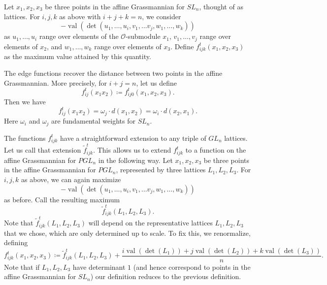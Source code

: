 \documentclass[ALCO,ThmDefs,Unicode,epreuves]{cedram}
\newcommand{\cO}{\mathcal{O}}
\newcommand{\val}{\operatorname{val}}
\begin{document}
Let $x_1, x_2, x_3$ be three points in the affine Grassmannian for $SL_n$, thought of as lattices. For $i, j, k$ as above with $i+j+k=n$, we consider
\[
-\val(\det(u_1, \dots, u_i, v_1, \dots v_j, w_1, \dots, w_k))
\]
as $u_1, \dots, u_i$ range over elements of the $\cO$-submodule $x_1$, $v_1, \dots, v_j$ range over elements of $x_2$, and $w_1, \dots, w_k$ range over elements of $x_3$. Define $f_{ijk}^t (x_1,x_2,x_3)$ as the maximum value attained by this quantity.

\begin{rema} The edge functions recover the distance between two points in the affine Grassmannian. More precisely, for $i+j=n$, let us define
\[
f^t_{ij}(x_1x_2) \coloneqq  f_{ij0}^t (x_1,x_2,x_3).
\]
Then we have
\[
f^t_{ij}(x_1x_2) = \omega_j \cdot d(x_1,x_2) = \omega_i \cdot d(x_2,x_1).
\]
 Here $\omega_i$ and $\omega_j$ are fundamental weights for $SL_n$.
\end{rema}


The functions $f_{ijk}^t$ have a straightforward extension to any triple of $GL_n$ lattices. Let us call that extension $\tilde{f}_{ijk}^t.$ This allows us to extend $f_{ijk}^t$ to a function on the affine Grassmannian for $PGL_n$ in the following way. Let $x_1, x_2, x_3$ be three points in the affine Grassmannian for $PGL_n$, represented by three lattices $L_1, L_2, L_3$. For $i, j, k$ as above, we can again maximize
\[
-\val(\det(u_1, \dots, u_i, v_1, \dots v_j, w_1, \dots, w_k))
\]
as before. Call the resulting maximum
\[
\tilde{f}_{ijk}^t (L_1,L_2,L_3).
\]
 Note that $\tilde{f}_{ijk}^t (L_1,L_2,L_3)$ will depend on the representative lattices $L_1, L_2, L_3$ that we chose, which are only determined up to scale. To fix this, we renormalize, defining
\begin{equation} \label{PGLfunction}
f_{ijk}^t (x_1,x_2,x_3) \coloneqq  \tilde{f}_{ijk}^t (L_1,L_2,L_3) + \frac{i\val(\det(L_1)) + j\val(\det(L_2)) + k\val(\det(L_3))}{n}.
\end{equation}
Note that if $L_1, L_2, L_3$ have determinant $1$ (and hence correspond to points in the affine Grassmannian for $SL_n$) our definition reduces to the previous definition.
\end{document}
